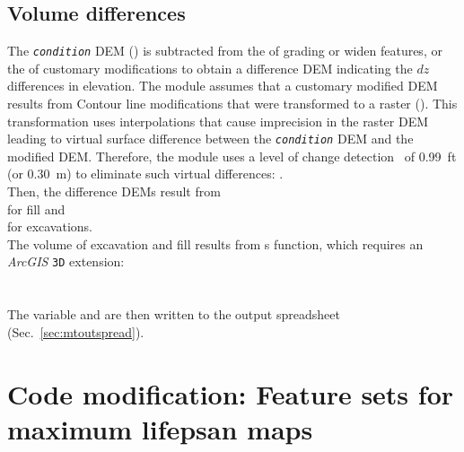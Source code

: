 \subsection{Volume differences}\label{sec:mtvoldiff}
The \texttt{\textit{condition}} DEM () is subtracted from the  of grading or widen features, or the  of customary modifications to obtain a difference DEM  indicating the $dz$ differences in elevation. The module assumes that a customary modified DEM results from Contour line modifications that were transformed to a raster (). This transformation uses interpolations that cause imprecision in the raster DEM leading to virtual surface difference between the \texttt{\textit{condition}} DEM and the modified DEM. Therefore, the module uses a level of change detection~ of 0.99~ft (or 0.30~m) to eliminate such virtual differences: .\\
Then, the difference DEMs result from\\
 for fill and \\
 for excavations.\\
The volume of excavation and fill results from s  function, which requires an \textit{ArcGIS} \texttt{3D} extension:\\
 \\
 \\
The variable  and  are then written to the output spreadsheet (Sec.~\ref{sec:mtoutspread}).



\section{Code modification: Feature sets for maximum lifepsan maps} \label{sec:mtcode}

